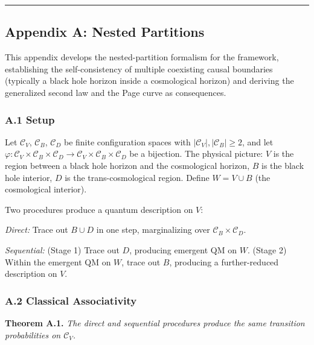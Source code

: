 \documentclass[
]{article}
\begin{document}
\begin{center}\rule{0.5\linewidth}{0.5pt}\end{center}

\hypertarget{appendix-a-nested-partitions}{%
\subsection{Appendix A: Nested
Partitions}\label{appendix-a-nested-partitions}}

This appendix develops the nested-partition formalism for the framework,
establishing the self-consistency of multiple coexisting causal
boundaries (typically a black hole horizon inside a cosmological
horizon) and deriving the generalized second law and the Page curve as
consequences.

\hypertarget{a.1-setup}{%
\subsubsection{A.1 Setup}\label{a.1-setup}}

Let \(\mathcal{C}_V\), \(\mathcal{C}_B\), \(\mathcal{C}_D\) be finite
configuration spaces with \(|\mathcal{C}_V|, |\mathcal{C}_B| \geq 2\),
and let
\(\varphi: \mathcal{C}_V \times \mathcal{C}_B \times \mathcal{C}_D \to \mathcal{C}_V \times \mathcal{C}_B \times \mathcal{C}_D\)
be a bijection. The physical picture: \(V\) is the region between a
black hole horizon and the cosmological horizon, \(B\) is the black hole
interior, \(D\) is the trans-cosmological region. Define
\(W = V \cup B\) (the cosmological interior).

Two procedures produce a quantum description on \(V\):

\emph{Direct:} Trace out \(B \cup D\) in one step, marginalizing over
\(\mathcal{C}_B \times \mathcal{C}_D\).

\emph{Sequential:} (Stage 1) Trace out \(D\), producing emergent QM on
\(W\). (Stage 2) Within the emergent QM on \(W\), trace out \(B\),
producing a further-reduced description on \(V\).

\hypertarget{a.2-classical-associativity}{%
\subsubsection{A.2 Classical
Associativity}\label{a.2-classical-associativity}}

\textbf{Theorem A.1.} \emph{The direct and sequential procedures produce
the same transition probabilities on \(\mathcal{C}_V\).}
\end{document}
